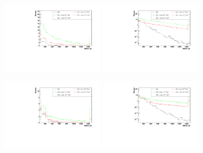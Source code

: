 \begin{figure}[h]
  \begin{center}
	\includegraphics[width=0.45\textwidth]{Plots/aQGC_kinematics/lepton_pt_FS1.pdf}%
	\includegraphics[width=0.45\textwidth]{Plots/aQGC_kinematics/lepton_pt_FS1_log.pdf}\\				
    \caption{}
  \end{center}
\end{figure}

\begin{figure}[h]
  \begin{center}
	\includegraphics[width=0.45\textwidth]{Plots/aQGC_kinematics/lepton_pt_FT0.pdf}%
	\includegraphics[width=0.45\textwidth]{Plots/aQGC_kinematics/lepton_pt_FT0_log.pdf}\\				
    \caption{}
  \end{center}
\end{figure}

